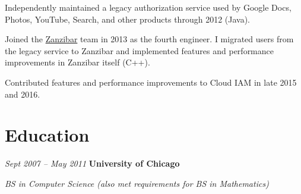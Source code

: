 \documentclass[10pt, letterpaper]{article}
\begin{document}
\vspace{0.1 cm}
\begin{onecolentry}
    \begin{highlights}
        \item Independently maintained a legacy authorization service used by Google Docs, Photos, YouTube, Search, and other products through 2012 (Java).
        \item Joined the \href{https://research.google/pubs/zanzibar-googles-consistent-global-authorization-system/}{Zanzibar} team in 2013 as the fourth engineer. I migrated users from the legacy service to Zanzibar and implemented features and performance improvements in Zanzibar itself (C++).
        \item Contributed features and performance improvements to Cloud IAM in late 2015 and 2016.
    \end{highlights}
\end{onecolentry}

\section{Education}

\begin{twocolentry}{
    \textit{Sept 2007 – May 2011}
}
    \textbf{University of Chicago}
\end{twocolentry}

\begin{onecolentry}
    \textit{BS in Computer Science (also met requirements for BS in Mathematics)}
\end{onecolentry}

\begin{comment}

\vspace{0.1 cm}

\begin{onecolentry}
    \begin{highlights}
        \item ACM International Collegiate Programming Contest (ICPC), World Finalist (2010, 2011)
        \item USA Powerlifting, Collegiate National Finalist (2011)
    \end{highlights}
\end{onecolentry}
\end{comment}
\end{document}
